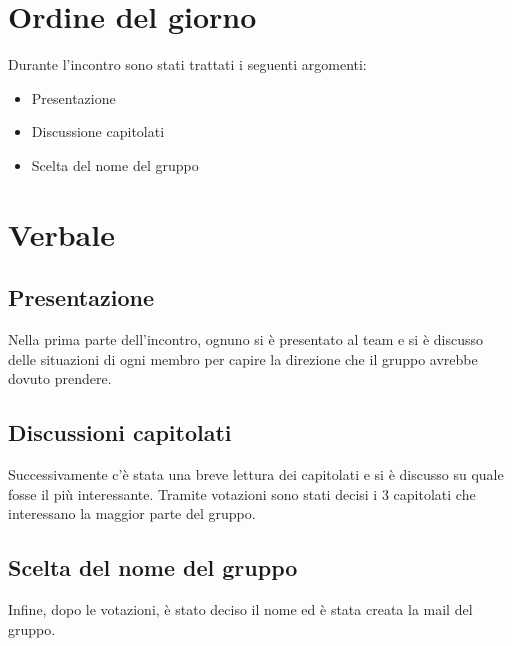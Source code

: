 \documentclass[italian, 12pt]{article}
\begin{document}
\section{Ordine del giorno}
Durante l'incontro sono stati trattati i seguenti argomenti: 
\begin{flushleft}
        \begin{itemize}
            \item Presentazione
            \item Discussione capitolati 
            \item Scelta del nome del gruppo
        \end{itemize}
\end{flushleft}
\newpage

\section{Verbale}
\subsection{Presentazione}
Nella prima parte dell'incontro, ognuno si è presentato al team e si è discusso delle situazioni di ogni membro per capire la direzione che il gruppo avrebbe dovuto prendere.

\subsection{Discussioni capitolati}
Successivamente c'è stata una breve lettura dei capitolati e si è discusso su quale fosse il più interessante. Tramite votazioni sono stati decisi i 3 capitolati che interessano la maggior parte del gruppo.

\subsection{Scelta del nome del gruppo}
Infine, dopo le votazioni, è stato deciso il nome ed è stata creata la mail del gruppo.  
\end{document}
